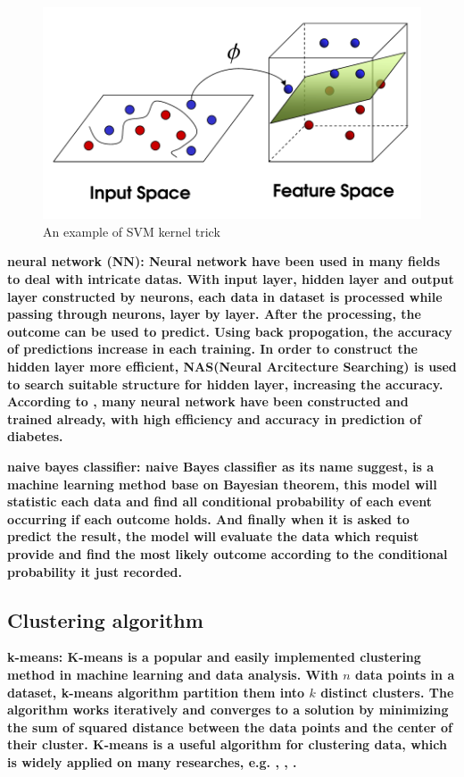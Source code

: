 \documentclass[twocolumn,10pt]{article}
\begin{document}
\begin{figure}[htb]
    \centering
    \includegraphics[scale=0.25]{assets/SVM_kernel_trick.png}
    \caption{An example of SVM kernel trick}
    \label{fig:SVM_kernel_trick}
\end{figure}

\bf{neural network (NN)}: \rm{Neural} network have been used in many fields to deal with intricate datas. 
With input layer, hidden layer and output layer constructed by neurons, each data in dataset is processed 
while passing through neurons, layer by layer. After the processing, the outcome can be used to predict. 
Using back propogation, the accuracy of predictions increase in each training. In order to construct the 
hidden layer more efficient, NAS(Neural Arcitecture Searching) is used to search suitable structure for 
hidden layer, increasing the accuracy. According to \cite{Gadekallu2020}\cite{Beghriche2021}, many neural 
network have been constructed and trained already, with high efficiency and accuracy in prediction of 
diabetes.


\bf{naive bayes classifier}: \rm{naive Bayes classifier} as its name suggest, is a machine learning method base on Bayesian 
theorem, this model will statistic each data and find all conditional probability of each event occurring if each outcome holds. 
And finally when it is asked to predict the result, the model will evaluate the data which requist provide and find the most 
likely outcome according to the conditional probability it just recorded. 

\subsection*{Clustering algorithm}

\bf{k-means}: \rm{K-means} is a popular and easily implemented clustering method in machine learning and 
data analysis. With $n$ data points in a dataset, k-means algorithm partition them into $k$ distinct 
clusters. The algorithm works iteratively and converges to a solution by minimizing the sum of squared 
distance between the data points and the center of their cluster. K-means is a useful algorithm for 
clustering data, which is widely applied on many researches, e.g. \cite{oyelade2010application}, 
\cite{NIDHEESH2017213}, \cite{kadhm2018accurate}.
\end{document}
